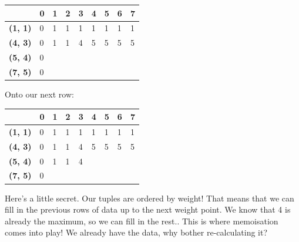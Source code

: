 \documentclass{article}
\begin{document}
\begin{center}
\begin{tabular}{|l|l|l|l|l|l|l|l|l|}
\hline
                & \textbf{0} & \textbf{1} & \textbf{2} & \textbf{3} & \textbf{4} & \textbf{5} & \textbf{6} & \textbf{7} \\ \hline
\textbf{(1, 1)} & 0          &1            &1            &1            &1            &1            &1            &1            \\ \hline
\textbf{(4, 3)} & 0          &1            &1            &4            &5            &5            &  5          &  5          \\ \hline
\textbf{(5, 4)} & 0          &            &            &            &            &            &            &            \\ \hline
\textbf{(7, 5)} & 0          &            &            &            &            &            &            &            \\ \hline
\end{tabular}
\end{center}
Onto our next row:
\begin{center}
\begin{tabular}{|l|l|l|l|l|l|l|l|l|}
\hline
                & \textbf{0} & \textbf{1} & \textbf{2} & \textbf{3} & \textbf{4} & \textbf{5} & \textbf{6} & \textbf{7} \\ \hline
\textbf{(1, 1)} & 0          &1            &1            &1            &1            &1            &1            &1            \\ \hline
\textbf{(4, 3)} & 0          &1            &1            &4            &5            &5            &  5          &  5          \\ \hline
\textbf{(5, 4)} & 0          &1            &1            &4            &            &            &            &            \\ \hline
\textbf{(7, 5)} & 0          &            &            &            &            &            &            &            \\ \hline
\end{tabular}
\end{center}
Here's a little secret. Our tuples are ordered by weight! That means that we can fill in the previous rows of data up to the next weight point. We know that 4 is already the maximum, so we can fill in the rest.. This is where memoisation comes into play! We already have the data, why bother re-calculating it?
\end{document}
